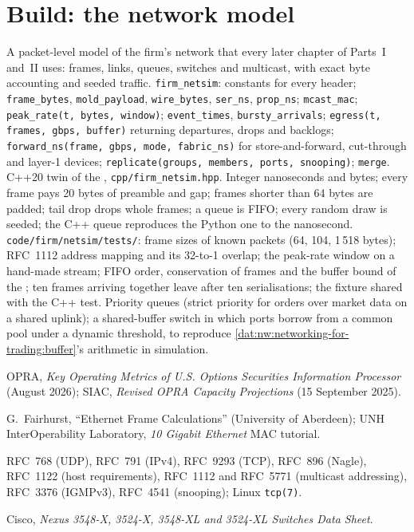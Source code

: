 \section{Build: the network model}\label{bld:nw:networking-for-trading:netsim}

\begin{build}
 A packet-level model of the firm's network that every later chapter of Parts~I and~II uses: frames, links,
queues, switches and multicast, with exact byte accounting and seeded traffic.
 \texttt{firm\_netsim}: constants for every header; \texttt{frame\_bytes}, \texttt{mold\_payload},
\texttt{wire\_bytes}, \texttt{ser\_ns}, \texttt{prop\_ns}; \texttt{mcast\_mac}; \texttt{peak\_rate(t, bytes, window)};
\texttt{event\_times}, \texttt{bursty\_arrivals}; \texttt{egress(t, frames, gbps, buffer)} returning departures, drops and
backlogs; \texttt{forward\_ns(frame, gbps, mode, fabric\_ns)} for store-and-forward, cut-through and layer-1 devices;
\texttt{replicate(groups, members, ports, snooping)}; \texttt{merge}. C++20 twin of the ,
\texttt{cpp/firm\_netsim.hpp}.
 Integer nanoseconds and bytes; every frame pays 20 bytes of preamble and gap; frames shorter than 64 bytes are
padded; tail drop drops whole frames; a queue is FIFO; every random draw is seeded; the C++ queue reproduces the Python one to
the nanosecond.
 \texttt{code/firm/netsim/tests/}: frame sizes of known packets (64, 104, 1\,518 bytes); RFC~1112
address mapping and its 32-to-1 overlap; the peak-rate window on a hand-made stream; FIFO order, conservation of frames and
the buffer bound of the ; ten frames arriving together leave after ten serialisations; the fixture shared with the
C++ test.
 Priority queues (strict priority for orders over market data on a shared uplink); a shared-buffer switch in
which ports borrow from a common pool under a dynamic threshold, to reproduce \cref{dat:nw:networking-for-trading:buffer}'s
arithmetic in simulation.
\end{build}

\begin{omsources}
\item OPRA, \emph{Key Operating Metrics of U.S. Options Securities Information Processor} (August 2026); SIAC, \emph{Revised
OPRA Capacity Projections} (15 September 2025).
\item G.~Fairhurst, ``Ethernet Frame Calculations'' (University of Aberdeen); UNH InterOperability Laboratory, \emph{10
Gigabit Ethernet} MAC tutorial.
\item RFC~768 (UDP), RFC~791 (IPv4), RFC~9293 (TCP), RFC~896 (Nagle), RFC~1122 (host requirements), RFC~1112 and RFC~5771
(multicast addressing), RFC~3376 (IGMPv3), RFC~4541 (snooping); Linux \texttt{tcp(7)}.
\item Cisco, \emph{Nexus 3548-X, 3524-X, 3548-XL and 3524-XL Switches Data Sheet}.
\end{omsources}

